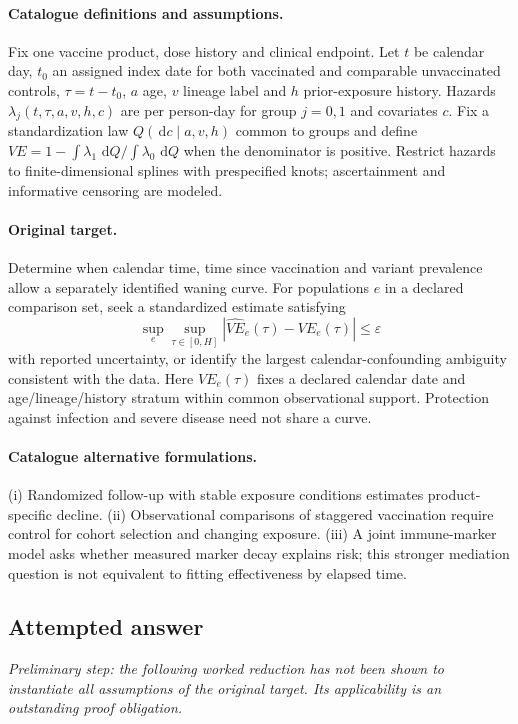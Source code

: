 \documentclass[11pt]{article}
\newcommand{\dd}{\,\mathrm d}
\begin{document}
\paragraph{Catalogue definitions and assumptions.}
Fix one vaccine product, dose history and clinical endpoint. Let $t$ be calendar day, $t_0$ an assigned index date for both vaccinated and comparable unvaccinated controls, $\tau=t-t_0$, $a$ age, $v$ lineage label and $h$ prior-exposure history. Hazards $\lambda_j(t,\tau,a,v,h,c)$ are per person-day for group $j=0,1$ and covariates $c$. Fix a standardization law $Q(\dd c\mid a,v,h)$ common to groups and define $VE=1-\int\lambda_1\,\dd Q/\int\lambda_0\,\dd Q$ when the denominator is positive. Restrict hazards to finite-dimensional splines with prespecified knots; ascertainment and informative censoring are modeled.
\paragraph{Original target.}
Determine when calendar time, time since vaccination and variant prevalence allow a separately identified waning curve. For populations $e$ in a declared comparison set, seek a standardized estimate satisfying
    \[\sup_{e}\sup_{\tau\in[0,H]}\left|\widehat{VE}_e(\tau)-VE_e(\tau)\right|\leq\varepsilon\]
    with reported uncertainty, or identify the largest calendar-confounding ambiguity consistent with the data. Here $VE_e(\tau)$ fixes a declared calendar date and age/lineage/history stratum within common observational support. Protection against infection and severe disease need not share a curve.
\paragraph{Catalogue alternative formulations.}
(i) Randomized follow-up with stable exposure conditions estimates product-specific decline. (ii) Observational comparisons of staggered vaccination require control for cohort selection and changing exposure. (iii) A joint immune-marker model asks whether measured marker decay explains risk; this stronger mediation question is not equivalent to fitting effectiveness by elapsed time.
\subsection{Attempted answer}
\noindent\emph{Preliminary step: the following worked reduction has not been shown to instantiate all assumptions of the original target. Its applicability is an outstanding proof obligation.}
\end{document}
